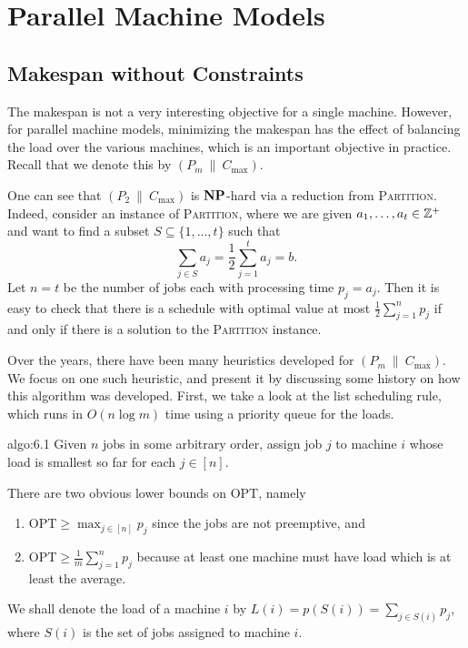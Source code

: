 \section{Parallel Machine Models} \label{sec:6}

\subsection{Makespan without Constraints} \label{subsec:6.1}
The makespan is not a very interesting objective for a single machine. 
However, for parallel machine models, minimizing the makespan has the effect 
of balancing the load over the various machines, which is an important 
objective in practice. Recall that we denote this by $(P_m~\|~C_{\max})$.

One can see that $(P_2~\|~C_{\max})$ is $\operatorname{\textbf{NP}}$-hard via a reduction from 
\textsc{Partition}. Indeed, consider an instance of \textsc{Partition}, 
where we are given $a_1, \dots, a_t \in \mathbb{Z}^+$ and want to find a subset 
$S \subseteq \{1, \dots, t\}$ such that 
\[ \sum_{j\in S} a_j = \frac12 \sum_{j=1}^t a_j = b. \] 
Let $n = t$ be the number of jobs each with processing time $p_j = a_j$. Then 
it is easy to check that there is a schedule with optimal value at most 
$\frac12 \sum_{j=1}^n p_j$ if and only if there is a solution to the 
\textsc{Partition} instance. 

Over the years, there have been many heuristics developed for 
$(P_m~\|~C_{\max})$. We focus on one such heuristic, and present it by 
discussing some history on how this algorithm was developed. First, we 
take a look at the list scheduling rule, which runs in $O(n\log m)$ time 
using a priority queue for the loads. 

\begin{algo}{algo:6.1}
    Given $n$ jobs in some arbitrary order, assign job $j$ to machine $i$ 
    whose load is smallest so far for each $j \in [n]$. 
\end{algo}

There are two obvious lower bounds on OPT, namely 
\begin{enumerate}[(1)]
    \item $\text{OPT} \geq \max_{j\in[n]} p_j$ since the jobs are not preemptive, and 
    \item $\text{OPT} \geq \frac1m \sum_{j=1}^n p_j$ because at least one machine must 
    have load which is at least the average. 
\end{enumerate}
We shall denote the load of a machine $i$ by $L(i) = p(S(i)) = 
\sum_{j\in S(i)} p_j$, where $S(i)$ is the set of jobs assigned to machine $i$.

